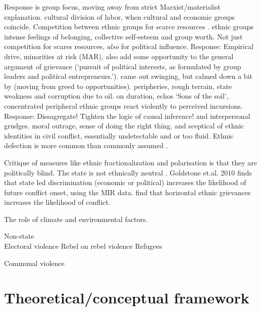 \documentclass[12pt]{article}
\begin{document}
Response is group focus, moving away from strict Marxist/materialist
explanation. \citet{Hechter_1978} cultural division of labor, when cultural and
economic groups coincide. Competition between ethnic groups for scarce resources
\citep{barth1969}. \citet{Horowitz1985} ethnic groups intense feelings of
belonging, collective self-esteem and group worth. Not just competition for
scares resources, \textit{also} for political influence. Response: Empirical
drive, minorities at risk (MAR)\citet{Gurr_1993, GurrTedRobert1993Mar:}, also
add some opportunity to the general argument of grievance (`pursuit of political
interests, as formulated by group leaders and political entrepreneurs.').
\citet{Collier2004} came out swinging, but calmed down a bit by
\citet{Collier2009} (moving from greed to opportunities). \citet{Fearon2003}
peripheries, rough terrain, state weakness and corruption due to oil.
\citet{Fearon_2004} on duration, echos \citet{WeinerMyron1978SotS} `Sons of the
soil', concentrated peripheral ethnic groups react violently to perceived
incursions. Response: Dissagregate! Tighten the logic of causal inference!
\citet{Kalyvas2006} and \citet{Kalyvas_2008} interpersonal grudges.
\citet{Wood2003} moral outrage, sense of doing the right thing.
\citet{Gilley_2004} and \citet{Chandra2006} sceptical of ethnic identities in
civil conflict, essentially undetectable and or too fluid. Ethnic defection is
more common than commonly assumed \citep{Kalyvas_2008}.

Critique of measures like ethnic fractionalization \citep{Alesina2003,
Posner2004} and polarisation \citep{Montalvo2005} is that they are politically
blind. The state is not ethnically neutral \citep{CedermanLars-Erik2013Igac}.
Goldstone et.al. 2010 finds that state led discrimination (economic or
political) increases the likelihood of future conflict onset, using the MIR
data. \citet{CedermanLars-Erik2013Igac} find that horizontal ethnic grievances
increases the likelihood of conflict.

The role of climate and environmental factors.

Non-state \\ 
Electoral violence \citep{Fjelde_2020}
Rebel on rebel violence \citep{Fjelde_2012}
Refugees \citep{Bohmelt_2018}

Communal violence \\
\citep{Fjelde2014}

\section{Theoretical/conceptual framework} \label{Theoretical/conceptual framework}
\end{document}
